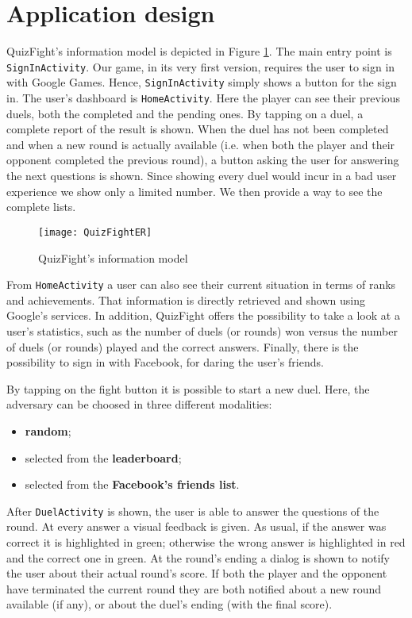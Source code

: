 \section{Application design}

QuizFight's information model is depicted in Figure \ref{fig:quizfighter}.
The main entry point is \texttt{SignInActivity}.
Our game, in its very first version, requires the user to sign in with Google
Games. Hence, \texttt{SignInActivity} simply shows a button for the sign in.
The user's dashboard is \texttt{HomeActivity}.
Here the player can see their previous duels, both the completed and the
pending ones.
By tapping on a duel, a complete report of the result is shown.
When the duel has not been completed and when a new round is actually
available (i.e. when both the player and their opponent completed the
previous round), a button asking the user for answering the next questions
is shown.
Since showing every duel would incur in a bad user experience we show
only a limited number. We then provide a way to see the complete lists.

\begin{figure}[t]
	\centering
	\texttt{[image: QuizFightER]}
	\caption{QuizFight's information model}
	\label{fig:quizfighter}
\end{figure}

From \texttt{HomeActivity} a user can also see their current situation in terms
of ranks and achievements.
That information is directly retrieved and shown using Google's services.
In addition, QuizFight offers the possibility to take a look at a user's
statistics, such as the number of duels (or rounds) won versus the number of
duels (or rounds) played and the correct answers.
Finally, there is the possibility to sign in with Facebook, for daring the
user's friends.

By tapping on the fight button it is possible to start a new duel.
Here, the adversary can be choosed in three different modalities:

\begin{itemize}
	\item \textbf{random};
	\item selected from the \textbf{leaderboard};
	\item selected from the \textbf{Facebook's friends list}.
\end{itemize}

After \texttt{DuelActivity} is shown, the user is able to answer the
questions of the round. At every answer a visual feedback is given.
As usual, if the answer was correct it is highlighted in green; otherwise the
wrong answer is highlighted in red and the correct one in green.
At the round's ending a dialog is shown to notify the user about their
actual round's score. If both the player and the opponent have terminated
the current round they are both notified about a new round available (if any),
or about the duel's ending (with the final score). 
